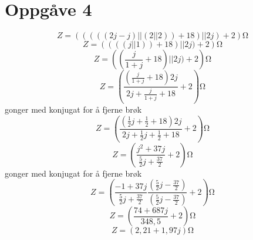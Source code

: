 \documentclass[12pt,a4paper]{article}
\begin{document}
  \section*{Oppgåve 4}
    \begin{equation}
      Z = \left( ( (( (2j-j) || (2||2)) + 18) || 2j ) + 2 \right) \si{\ohm}
    \end{equation}
    \begin{equation}
      Z = \left( ( (( j || 1)) + 18) || 2j ) + 2 \right) \si{\ohm}
    \end{equation}
    \begin{equation}
      Z = \left( ( \frac{j}{1+j} + 18) || 2j ) + 2 \right) \si{\ohm}
    \end{equation}
    \begin{equation}
      Z = \left( \frac{(\frac{j}{1+j} + 18)2j}{2j + \frac{j}{1+j} + 18}+ 2 \right) \si{\ohm}
    \end{equation}
    gonger med konjugat for å fjerne brøk
    \begin{equation}
      Z = \left( \frac{(\frac{1}{2}j + \frac{1}{2} + 18)2j}
      {2j + \frac{1}{2}j + \frac{1}{2} + 18}+ 2 \right) \si{\ohm}
    \end{equation}
    \begin{equation}
      Z = \left( \frac{j^2 + 37j}{\frac{5}{2}j + \frac{37}{2}}+ 2 \right) \si{\ohm}
    \end{equation}
    gonger med konjugat for å fjerne brøk
    \begin{equation}
      Z = \left( \frac{-1 + 37j}{\frac{5}{2}j + \frac{37}{2}}
      \frac{(\frac{5}{2}j - \frac{37}{2})}{(\frac{5}{2}j - \frac{37}{2})}
      + 2 \right) \si{\ohm}
    \end{equation}
    \begin{equation}
      Z = \left( \frac{74 + 687j}{348,5} + 2 \right) \si{\ohm}
    \end{equation}
    \begin{equation}
      Z = \left( 2,21 + 1,97j \right) \si{\ohm}
    \end{equation}


  \newpage
\end{document}

